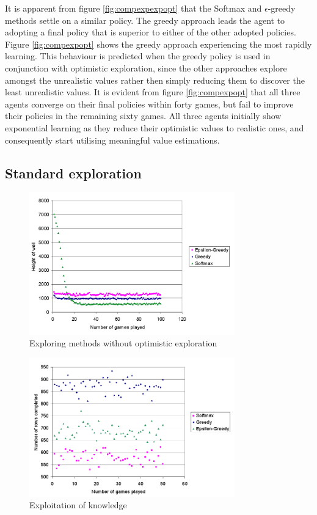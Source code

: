 \documentclass{rucsthesis}
\begin{document}
It is apparent from figure \ref{fig:compexpexpopt} that the Softmax and $\epsilon$-greedy methods settle on a similar policy. The greedy approach leads the agent to adopting a final policy that is superior to either of the other adopted policies. Figure \ref{fig:compexpopt} shows the greedy approach experiencing the most rapidly learning. This behaviour is predicted when the greedy policy is used in conjunction with optimistic exploration, since the other approaches explore amongst the unrealistic values rather then simply reducing them to discover the least unrealistic values. It is evident from figure \ref{fig:compexpopt} that all three agents converge on their final policies within forty games, but fail to improve their policies in the remaining sixty games. All three agents initially show exponential learning as they reduce their optimistic values to realistic ones, and consequently start utilising meaningful value estimations.

\subsection{Standard exploration}

\begin{figure}[h]
\centering
\includegraphics[width=3.5in]{nonoptomisticexp.png}
\caption{Exploring methods without optimistic exploration}
\label{fig:compexp}
\end{figure}

\begin{figure}[h]
\centering
\includegraphics[width=3.5in]{nonoptomisticexpexploit.png}
\caption{Exploitation of knowledge}
\label{fig:compexpexp}
\end{figure}
\end{document}
